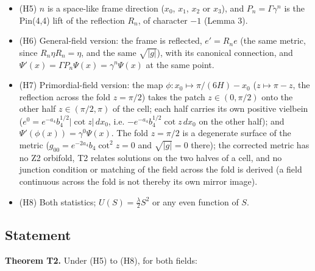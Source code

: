 \documentclass[11pt]{article}
\begin{document}
\begin{itemize}
\item (H5) $n$ is a space-like frame direction ($x_0$, $x_1$, $x_2$ or $x_3$), and $P_n = \Gamma\gamma^n$ is the Pin(4,4) lift of the reflection $R_n$, of character $-1$ (Lemma 3).
\item (H6) General-field version: the frame is reflected, $e' = R_ne$ (the same metric, since $R_n\eta R_n = \eta$, and the same $\sqrt{|g|}$), with its canonical connection, and $\Psi'(x) = \Gamma P_n\Psi(x) = \gamma^n\Psi(x)$ at the same point.
\item (H7) Primordial-field version: the map $\phi: x_0 \mapsto \pi/(6H) - x_0$ ($z \mapsto \pi - z$, the reflection across the fold $z = \pi/2$) takes the patch $z \in (0,\pi/2)$ onto the other half $z \in (\pi/2,\pi)$ of the cell; each half carries its own positive vielbein ($e^0 = e^{-a_4}b_4^{1/2}|\cot z|\,dx_0$, i.e. $-e^{-a_4}b_4^{1/2}\cot z\,dx_0$ on the other half); and $\Psi'(\phi(x)) = \gamma^0\Psi(x)$. The fold $z = \pi/2$ is a degenerate surface of the metric ($g_{00} = e^{-2a_4}b_4\cot^2 z = 0$ and $\sqrt{|g|} = 0$ there); the corrected metric has no Z2 orbifold, T2 relates solutions on the two halves of a cell, and no junction condition or matching of the field across the fold is derived (a field continuous across the fold is not thereby its own mirror image).
\item (H8) Both statistics; $U(S) = \frac{\lambda}{2}S^2$ or any even function of $S$.
\end{itemize}

\subsection{Statement}

\textbf{Theorem T2.} Under (H5) to (H8), for both fields:
\end{document}
